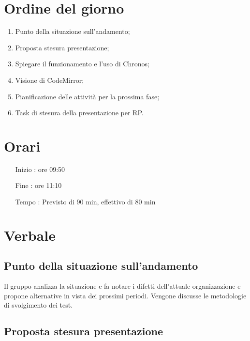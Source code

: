 \documentclass[11pt]{meetingmins}
\begin{document}
\maketitle

\section{Ordine del giorno}

\begin{enumerate}

  \item Punto della situazione sull'andamento;
  \item Proposta stesura presentazione;
  \item Spiegare il funzionamento e l'uso di Chronos;
  \item Visione di CodeMirror;
  \item Pianificazione delle attività per la prossima fase;
  \item Task di stesura della presentazione per RP.

\end{enumerate}

\section{Orari}

\begin{itemize}
\item[Inizio]: ore 09:50
\item[Fine]: ore 11:10
\item[Tempo]: Previsto di 90 min, effettivo di 80 min

\end{itemize}

\section{Verbale}

\subsection{Punto della situazione sull'andamento}

Il gruppo analizza la situazione e fa notare i difetti dell'attuale organizzazione e propone alternative in vista dei prossimi periodi. Vengone discusse le metodologie di svolgimento dei test.

\subsection{Proposta stesura presentazione}
\end{document}
